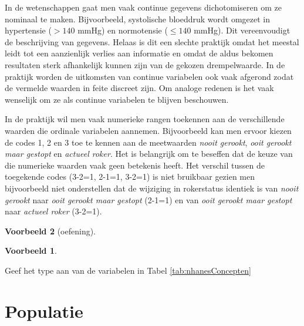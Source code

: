 \documentclass[
  12pt,dutch,coursenotes]{book}
\theoremstyle{definition}
\theoremstyle{definition}
\newtheorem{example}{Voorbeeld}[chapter]
\theoremstyle{definition}
\theoremstyle{remark}
\begin{document}
In de wetenschappen gaat men vaak continue
gegevens dichotomiseren om ze nominaal te maken. Bijvoorbeeld, systolische
bloeddruk wordt omgezet in hypertensie (\(>140\) mmHg) en normotensie (\(\leq 140\)
mmHg). Dit vereenvoudigt de beschrijving van gegevens. Helaas is dit een
slechte praktijk omdat het meestal leidt tot een aanzienlijk verlies aan informatie en
omdat de aldus bekomen resultaten sterk afhankelijk kunnen zijn van de
gekozen drempelwaarde. In de praktijk worden de uitkomsten van continue
variabelen ook vaak afgerond zodat de vermelde waarden in feite discreet
zijn. Om analoge redenen is het vaak wenselijk om ze als continue variabelen
te blijven beschouwen.

In de praktijk wil men vaak numerieke rangen toekennen aan de verschillende
waarden die ordinale variabelen aannemen. Bijvoorbeeld kan men ervoor kiezen
de codes 1, 2 en 3 toe te kennen aan de meetwaarden \emph{nooit gerookt}, \emph{ooit gerookt maar gestopt} en \emph{actueel roker}.
Het is belangrijk om te beseffen dat de keuze van die numerieke waarden vaak geen betekenis heeft.
Het verschil tussen de toegekende codes (3-2=1, 2-1=1, 3-2=1) is niet bruikbaar gezien men bijvoorbeeld niet onderstellen dat de wijziging in rokerstatus identiek is van \emph{nooit gerookt} naar \emph{ooit gerookt maar gestopt} (2-1=1) en van \emph{ooit gerookt maar gestopt} naar \emph{actueel roker} (3-2=1).

\begin{example}[oefening]
\begin{example}

\protect\hypertarget{exm:unnamed-chunk-30}{}{\label{exm:unnamed-chunk-30} \iffalse (oefening) \fi{} }

\end{example}
\end{example}

Geef het type aan van de variabelen in Tabel \ref{tab:nhanesConcepten}

\hypertarget{subsec:pop}{%
\section{Populatie}\label{subsec:pop}}
\end{document}
